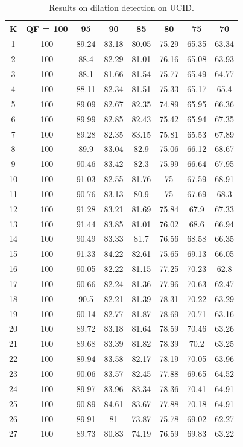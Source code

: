 \documentclass[review]{elsarticle}
\begin{document}
		
	\begin{longtable}{c|ccccccc}
		\caption{Results on dilation detection on UCID.}
		\label{table:uciddilation}\\
		\hline\hline
		\textbf{K}&\textbf{QF = 100}&\textbf{95}&\textbf{90}&\textbf{85}&\textbf{80}&\textbf{75}&\textbf{70}\\
		\hline
		1&100&89.24&83.18&80.05&75.29&65.35&63.34\\
		2&100&88.4&82.29&81.01&76.16&65.08&63.93\\
		3&100&88.1&81.66&81.54&75.77&65.49&64.77\\
		4&100&88.11&82.34&81.51&75.33&65.17&65.4\\
		5&100&89.09&82.67&82.35&74.89&65.95&66.36\\
		6&100&89.99&82.85&82.43&75.42&65.94&67.35\\
		7&100&89.28&82.35&83.15&75.81&65.53&67.89\\
		8&100&89.9&83.04&82.9&75.06&66.12&68.67\\
		9&100&90.46&83.42&82.3&75.99&66.64&67.95\\
		10&100&91.03&82.55&81.76&75&67.59&68.91\\
		11&100&90.76&83.13&80.9&75&67.69&68.3\\
		12&100&91.28&83.21&81.69&75.84&67.9&67.33\\
		13&100&91.44&83.85&81.01&76.02&68.6&66.94\\
		14&100&90.49&83.33&81.7&76.56&68.58&66.35\\
		15&100&91.33&84.22&82.61&75.65&69.13&66.05\\
		16&100&90.05&82.22&81.15&77.25&70.23&62.8\\
		17&100&90.66&82.24&81.36&77.96&70.63&62.47\\
		18&100&90.5&82.21&81.39&78.31&70.22&63.29\\
		19&100&90.14&82.77&81.87&78.69&70.71&63.16\\
		20&100&89.72&83.18&81.64&78.59&70.46&63.26\\
		21&100&89.68&83.39&81.82&78.39&70.2&63.25\\
		22&100&89.94&83.58&82.17&78.19&70.05&63.96\\
		23&100&90.06&83.57&82.45&77.88&69.65&64.52\\
		24&100&89.97&83.96&83.34&78.36&70.41&64.91\\
		25&100&90.89&84.61&83.67&77.88&70.18&64.91\\
		26&100&89.91&81&73.87&75.78&69.02&62.27\\
		27&100&89.73&80.83&74.19&76.59&69.83&63.22\\

\end{longtable}
\end{document}
